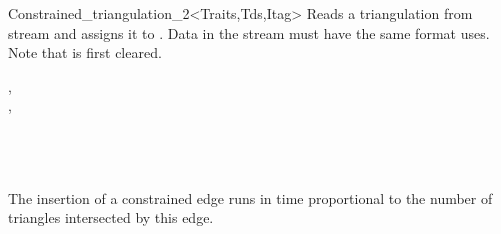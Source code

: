 \begin{ccRefClass}{Constrained_triangulation_2<Traits,Tds,Itag>}
{Reads a triangulation from stream  and assigns it to . Data in the stream must have the same format  uses. 
Note that  is first cleared.}

\ccSeeAlso
{}, \\
, \\
 \\
 \\
 \\





 The insertion of a constrained edge runs in time
proportional to the number of triangles intersected by this edge.


\end{ccRefClass}


